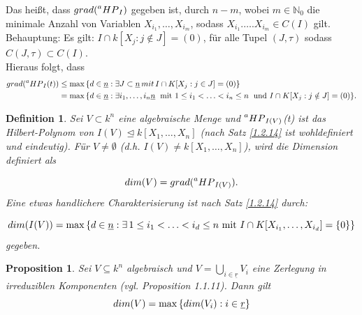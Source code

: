 \documentclass{article}
\newtheorem{definition}[satz]{Definition}
\newtheorem{proposition}[satz]{Proposition}
\newcommand*{\R}{k[X_{1},\ldots,X_{n}]}
\newcommand*{\indx}[2]{{#1}_{#2}}
\newcommand*{\N}{\mathbb{N}_0}
\newcommand*{\hp}[1]{$\prescript{a}{}{HP}_{#1}$}
\begin{document}
\begin{compactenum}
Das heißt, dass $grad(\textnormal{\hp{I}})$ gegeben ist, durch $n-m$, wobei $m\in\N$ die minimale Anzahl von Variablen $\indx{X}{\indx{i}{1}},\ldots,\indx{X}{\indx{i}{m}}$, sodass $\indx{X}{\indx{i}{1}}.\ldots.\indx{X}{\indx{i}{m}}\in C(I)$ gilt.\\
	
Behauptung: Es gilt: $I\cap k\left[\indx{X}{j}:j\notin J\right]={(0)}$, für alle Tupel $(J,\tau)$ sodass $C(J,\tau)\subset C(I)$.\\

Hieraus folgt, dass
\begin{align*}
grad(\textnormal{\hp{I}}(t))&\leq \max{\{d\in\underline{n}:\exists J\subset\underline{n}\, mit\,I\cap K[\indx{X}{j}:j\in J]=(0)\}}\\&
= \max{\{d\in\underline{n}:\exists \indx{i}{1},\ldots,\indx{i}{n}\underline{n}\; \textnormal{ mit }  1\leq\indx{i}{1}<\ldots<\indx{i}{n}\leq n\;\textnormal{ und }I\cap K[\indx{X}{j}:j\notin J]=(0)\}}.
\end{align*}
\end{compactenum}

\begin{definition}
	Sei $V\subset k^n$ eine algebraische Menge und \hp{I(V)}(t) ist das Hilbert-Polynom von $I(V)\unlhd\R$ (nach Satz \ref{1.2.14} ist wohldefiniert und eindeutig). Für $V\neq\emptyset$ (d.h. $I(V)\neq\R$), wird die Dimension definiert als 
	
	\begin{displaymath}
	dim(V)=grad(\textnormal{\hp{I(V)}}).
	\end{displaymath}
	Eine etwas handlichere Charakterisierung ist nach Satz \ref{1.2.14} durch:
	
	\begin{displaymath}
	dim(I(V))=\max{\{d\in\underline{n}:\exists{\,} 1\leq\indx{i}{1}<\ldots<\indx{i}{d}\leq n \textnormal{ mit } I\cap K[\indx{X}{\indx{i}{1}},\ldots,\indx{X}{\indx{i}{d}}]=\{0\} \}}
	\end{displaymath}
	gegeben.\\
\end{definition}


\begin{proposition}
	Sei $V\subseteq k^n$ algebraisch und $V=\bigcup\limits_{i\in\underline{r}}\indx{V}{i}$ eine Zerlegung in irreduziblen Komponenten (vgl. Proposition 1.1.11). Dann gilt
	\begin{displaymath}
	dim(V)=\max{\{dim(\indx{V}{i}):i\in\underline{r}\}}\\
	\end{displaymath}
	\\
\end{proposition}
\end{document}
